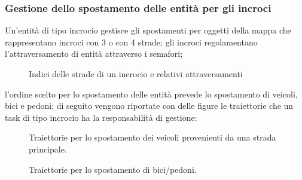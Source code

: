 \newpage

\subsubsection{Gestione dello spostamento delle entità per gli incroci}
\label{spostamentoIncroci}
Un'entità di tipo incrocio gestisce gli spostamenti per oggetti della mappa che rappresentano incroci con 3 o con 4 strade; gli incroci regolamentano l'attraversamento di entità attraverso i semafori;

\begin{figure}[H] %
\caption{Indici delle strade di un incrocio e relativi attraversamenti}
\label{fig:Indici delle strade di un incrocio e relativi attraversamenti}
\end{figure}

l'ordine scelto per lo spostamento delle entità prevede lo spostamento di veicoli, bici e pedoni; di seguito vengono riportate con delle figure le traiettorie che un task di tipo incrocio ha la responsabilità di gestione:

\begin{figure}[H] %
\caption{Traiettorie per lo spostamento dei veicoli provenienti da una strada principale.}
\label{fig:Traiettorie per lo spostamento dei veicoli provenienti da una strada principale}
\end{figure}

\begin{figure}[H] %
\caption{Traiettorie per lo spostamento di bici/pedoni.}
\label{fig:Traiettorie per lo spostamento di bici/pedoni provenienti da una strada principale}
\end{figure}

